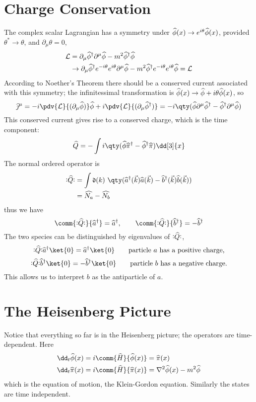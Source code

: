 \section{Charge Conservation}
\label{sec:charge-conservation}

The complex scalar Lagrangian has a symmetry under ${\widehat{\phi}}(x) \to
e^{i \theta} {\widehat{\phi}}(x)$, provided $\theta^{*} \to \theta$, and
$\partial_{\mu} \theta = 0$,
\begin{align*}
  \mathcal{L} &= \partial_{\mu} {\widehat{\phi}}^{\dagger} \partial^{\mu} {\widehat{\phi}} - m^2 {\widehat{\phi}}^{\dagger} {\widehat{\phi}} 
  \\& \to 
  \partial_{\mu} {\widehat{\phi}}^{\dagger} e^{-i \theta} e^{i \theta} \partial^{\mu} {\widehat{\phi}} - m^2 {\widehat{\phi}}^{\dagger} e^{-i \theta} e^{i \theta} {\widehat{\phi}} = \mathcal{L}
\end{align*}
According to Noether's Theorem there should be a conserved current
associated with this symmetry; the infinitessimal transformation is
${\widehat{\phi}}(x) \to {\widehat{\phi}} + i \theta {\widehat{\phi}}(x)$, so
\[ \Op{\jmath}^{\mu} = -i \pdv{\Lag}{(\partial_{\mu} \Op{\phi})}
\Op{\phi} + i \pdv{\Lag}{(\partial_{\mu} \hOp{\phi})} = -i \qty(
\Op{\phi} \partial^{\mu} \hOp{\phi} - \hOp{\phi} \partial^{\mu}
\Op{\phi}) \]
This conserved current gives rise to a conserved charge, which is the time component:
\begin{equation}
  \label{eq:12}
  \Op{Q} = - \int i \qty( \Op{\phi} \hOp{\pi} - \hOp{\phi} \Op{\pi} ) \dd[3]{x}
\end{equation}
The normal ordered operator is
\begin{align*} 
\nOp{Q} &= \int \nm{k} \qty( \hOp{a}(\vec{k}) \Op{a}(\vec{k}) - \hOp{b}(\vec{k}) \Op{b}(\vec{k}) ) \\
&= \Op{N_a} - \Op{N_b}
\end{align*}
thus we have
\[ \comm{ \nOp{Q} }{ \hOp{a} } = \hOp{a}, \qquad \comm{ \nOp{Q} }{ \hOp{b} } = - \hOp{b} \]
The two species can be distinguished by eigenvalues of $\nOp{Q}$, 
\[ \nOp{Q} \hOp{a} \ket{0} = \hOp{a} \ket{0} \qquad \text{particle $a$ has a positive charge,}\]
\[ \nOp{Q} \hOp{b} \ket{0} = - \hOp{b} \ket{0} \qquad \text{particle
  $b$ has a negative charge.}\] This allows us to interpret $b$ as the
antiparticle of $a$.

\section{The Heisenberg Picture}
\label{sec:heisenberg-picture}

Notice that everything so far is in the Heisenberg picture; the
operators are time-dependent. Here
\begin{align*}
  \dd_t{} \Op{\phi}(x) &= i \comm{ \Op{H} }{ \Op{\phi}(x) } = \Op{\pi}(x) \\
  \dd_t{} \Op{\pi}(x) &= i \comm{ \Op{H} }{ \Op{\pi}(x) } = \nabla^2 \Op{\phi}(x) - m^2 \Op{\phi}
\end{align*}
which is the equation of motion, the Klein-Gordon equation. Similarly
the states are time independent.

